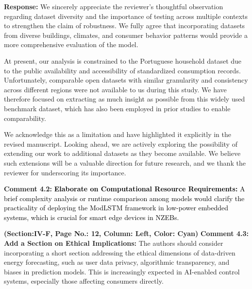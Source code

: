 \documentclass[12pt]{article}
\begin{document}
\hspace{-1.5em}\textbf{Response:}
We sincerely appreciate the reviewer’s thoughtful observation regarding dataset diversity and the importance of testing across multiple contexts to strengthen the claim of robustness. We fully agree that incorporating datasets from diverse buildings, climates, and consumer behavior patterns would provide a more comprehensive evaluation of the model.

At present, our analysis is constrained to the Portuguese household dataset due to the public availability and accessibility of standardized consumption records. Unfortunately, comparable open datasets with similar granularity and consistency across different regions were not available to us during this study. We have therefore focused on extracting as much insight as possible from this widely used benchmark dataset, which has also been employed in prior studies to enable comparability.

We acknowledge this as a limitation and have highlighted it explicitly in the revised manuscript. Looking ahead, we are actively exploring the possibility of extending our work to additional datasets as they become available. We believe such extensions will be a valuable direction for future research, and we thank the reviewer for underscoring its importance.\newline
\newline




\noindent\textbf{Comment 4.2:} \noindent\textcolor{black}{\textbf{Elaborate on Computational Resource Requirements:} A brief complexity analysis or runtime comparison among models would clarify the practicality of deploying the ModLSTM framework in low-power embedded systems, which is crucial for smart edge devices in NZEBs.}

\vspace{0.15cm}

 \textbf{(Section:IV-F, Page No.: 12, Column: Left, Color: Cyan)}\newline
\newline
\noindent\textbf{Comment 4.3:} \textbf{Add a Section on Ethical Implications:} The authors should consider incorporating a short section addressing the ethical dimensions of data-driven energy forecasting, such as user data privacy, algorithmic transparency, and biases in prediction models. This is increasingly expected in AI-enabled control systems, especially those affecting consumers directly.
\vspace{0.15cm}
\end{document}

